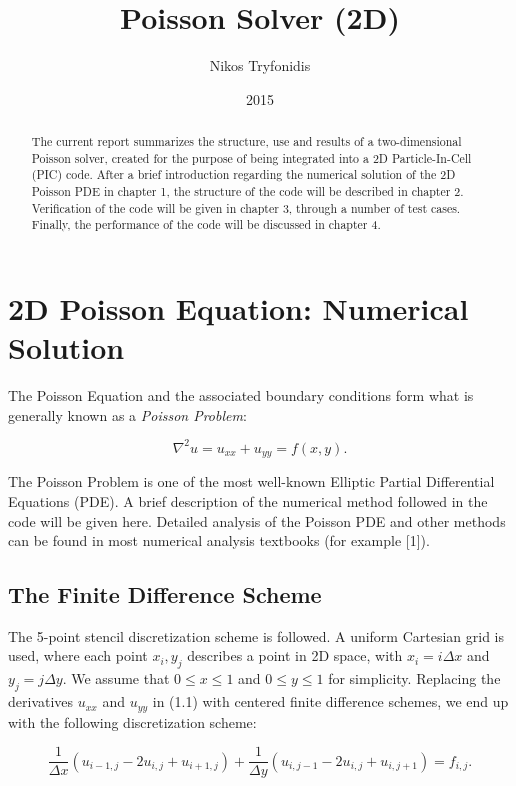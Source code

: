 \documentclass[11pt]{report}
\begin{document}
\title{Poisson Solver (2D)}
\author{Nikos Tryfonidis}
\date{2015}
\maketitle

\tableofcontents

\begin{abstract}
The current report summarizes the structure, use and results of a two-dimensional Poisson solver, 
created for the purpose of being integrated into a 2D Particle-In-Cell (PIC) code. After a brief introduction 
regarding the numerical solution of the 2D Poisson PDE in chapter 1, the structure of the code will be 
described in chapter 2. Verification of the code will be given in chapter 3, through a number of test cases. 
Finally, the performance of the code will be discussed in chapter 4.
\end{abstract}

\chapter{2D Poisson Equation: Numerical Solution}
The Poisson Equation and the associated boundary conditions form what is generally known as a 
\emph{Poisson Problem}: 

\begin{equation}
\nabla ^2 u = u_{xx} + u_{yy} = f(x,y).
\end{equation}

The Poisson Problem is one of the most well-known Elliptic Partial Differential Equations (PDE). A brief description of the numerical method followed in the code will be given here. Detailed analysis of the Poisson PDE and other methods can be found in most numerical analysis textbooks (for example [1]).

\section{The Finite Difference Scheme}
The 5-point stencil discretization scheme is followed. A uniform Cartesian grid is used, where each point $x_i, y_j$ describes a point in 2D space, with $x_i = i\Delta x$ and $y_j = j\Delta y$. We assume that $0 \leq x \leq 1$ and $0 \leq y \leq 1$ for simplicity. Replacing the derivatives $u_{xx}$ and $u_{yy}$ in (1.1) with centered finite difference schemes, we end up with the following discretization scheme:

\begin{equation}
\frac{1}{\Delta x}(u_{i-1,j} -2u_{i,j} + u_{i+1,j}) + 
\frac{1}{\Delta y}(u_{i,j-1} -2u_{i,j} + u_{i,j+1}) = f_{i,j}.
\end{equation}
\end{document}
